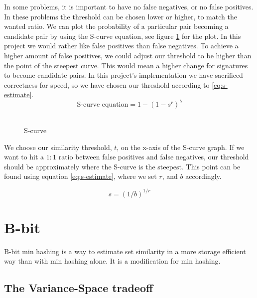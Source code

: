 \documentclass[a4paper,11pt]{article}
\begin{document}
In some problems, it is important to have no false negatives, or no false positives. In these problems the threshold can be chosen lower or higher, to match the wanted ratio. We can plot the probability of a particular pair becoming a candidate pair by using the S-curve equation, see figure \ref{fig:scurve} for the plot. In this project we would rather like false positives than false negatives. To achieve a higher amount of false positives, we could adjust our threshold to be higher than the point of the steepest curve. This would mean a higher change for signatures to become candidate pairs. In this project's implementation we have sacrificed correctness for speed, so we have chosen our threshold according to \ref{eq:s-estimate}. \\

\begin{equation}
    \text {S-curve equation} = 1 - (1 - s^r)^b 
\end{equation}\\

\begin{figure}[!htpb]
    \begin{center}
        
        \caption{S-curve}
        \label{fig:scurve}
    \end{center}
\end{figure}

We choose our similarity threshold, $t$, on the x-axis of the S-curve graph. If we want to hit a $1:1$ ratio between false positives and false negatives, our threshold should be approximately where the S-curve is the steepest. This point can be found using equation \ref{eq:s-estimate}, where we set $r$, and $b$ accordingly.

\begin{equation}
    s = (1/b)^{1/r}
    \label{eq:s-estimate}
\end{equation}




\section{B-bit}
B-bit min hashing is a way to estimate set similarity in a more storage efficient way than with min hashing alone. It is a modification for min hashing.

\subsection{The Variance-Space tradeoff}
\end{document}
